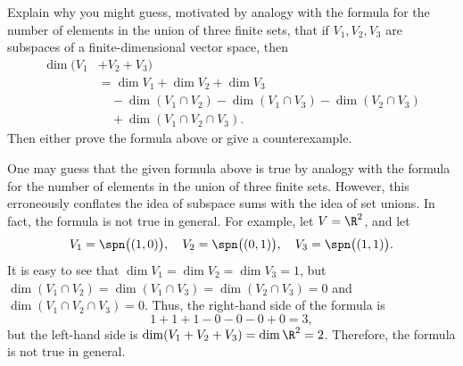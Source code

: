 \begin{exercise}
Explain why you might guess, motivated by analogy with the formula for the
number of elements in the union of three finite sets, that if $V_1,V_2,V_3$ are
subspaces of a finite-dimensional vector space, then
\begin{align*}
\dim(V_1&+V_2+V_3)\\
  &= \dim V_1+\dim V_2+\dim V_3\\
  &\quad-\dim(V_1\cap V_2)-\dim(V_1\cap V_3)-\dim(V_2\cap V_3)\\
  &\quad+\dim(V_1\cap V_2\cap V_3).
\end{align*}
Then either prove the formula above or give a counterexample.
\end{exercise}
\begin{solution}
One may guess that the given formula above is true by analogy with the formula
for the number of elements in the union of three finite sets. However, this
erroneously conflates the idea of subspace sums with the idea of set unions. In
fact, the formula is not true in general. For example, let $V=\R^2$, and let
\[ V_1=\spn\bigl((1,0)\bigr), \quad V_2=\spn\bigl((0,1)\bigr), \quad
   V_3=\spn\bigl((1,1)\bigr). \]
It is easy to see that $\dim V_1=\dim V_2=\dim V_3=1$, but
$\dim(V_1\cap V_2)=\dim(V_1\cap V_3)=\dim(V_2\cap V_3)=0$ and
$\dim(V_1\cap V_2\cap V_3)=0$. Thus, the right-hand side of the formula is
\[ 1+1+1-0-0-0+0 = 3, \]
but the left-hand side is $\dim(V_1+V_2+V_3)=\dim\R^2=2$. Therefore, the
formula is not true in general.
\end{solution}

